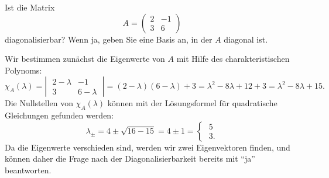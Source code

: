 Ist die Matrix
\[
A
=
\begin{pmatrix}
2&-1\\
3& 6
\end{pmatrix}
\]
diagonalisierbar?
Wenn ja, geben Sie eine Basis an, in der $A$ diagonal ist.


\begin{loesung}
Wir bestimmen zunächst die Eigenwerte von $A$ mit Hilfe des charakteristischen
Polynoms:
\[
\chi_A(\lambda)=\left|\;\begin{matrix}
2-\lambda&        -1\\
        3& 6-\lambda
\end{matrix}\;\right|
=(2-\lambda)(6-\lambda)+3=\lambda^2-8\lambda+12+3
=\lambda^2-8\lambda+15.
\]
Die Nullstellen von $\chi_A(\lambda)$ können mit der Lösungsformel
für quadratische Gleichungen gefunden werden:
\[
\lambda_{\pm}
=
4\pm\sqrt{16-15}=4\pm 1=\begin{cases}\;5\\\;3.\end{cases}
\]
Da die Eigenwerte verschieden sind, werden wir zwei Eigenvektoren finden,
und können daher die Frage nach der Diagonalisierbarkeit bereits mit
``ja'' beantworten.


\end{loesung}
